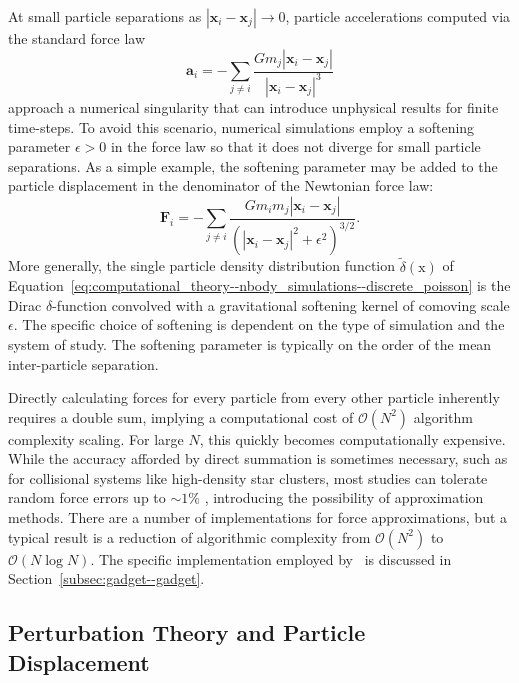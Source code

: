At small particle separations as $|\mathbf{x}_{i} - \mathbf{x}_{j}| \rightarrow 0$, particle accelerations computed via the standard force law
\begin{equation}
	\mathbf{a}_{i} = -\sum_{j \ne i} \frac{G m_{j} | \mathbf{x}_{i} - \mathbf{x}_{j} |}{| \mathbf{x}_{i} - \mathbf{x}_{j} |^{3}}
\end{equation}
approach a numerical singularity that can introduce unphysical results for finite time-steps.  To avoid this scenario, numerical simulations employ a softening parameter $\epsilon > 0$ in the force law so that it does not diverge for small particle separations.  As a simple example, the softening parameter may be added to the particle displacement in the denominator of the Newtonian force law:
\begin{equation}
	\mathbf{F}_{i} = -\sum_{j \ne i} \frac{G m_{i} m_{j} | \mathbf{x}_{i} - \mathbf{x}_{j} |}{(| \mathbf{x}_{i} - \mathbf{x}_{j} |^{2} + \epsilon^{2})^{3/2}}.
\end{equation}
More generally, the single particle density distribution function $\tilde{\delta}(\mathrm{x})$ of Equation~\ref{eq:computational_theory--nbody_simulations--discrete_poisson} is the Dirac $\delta$-function convolved with a gravitational softening kernel of comoving scale $\epsilon$.  The specific choice of softening is dependent on the type of simulation and the system of study.  The softening parameter is typically on the order of the mean inter-particle separation.

Directly calculating forces for every particle from every other particle inherently requires a double sum, implying a computational cost of $\mathcal{O}(N^{2})$ algorithm complexity scaling.  For large $N$, this quickly becomes computationally expensive.  While the accuracy afforded by direct summation is sometimes necessary, such as for collisional systems like high-density star clusters, most studies can tolerate random force errors up to $\sim 1\%$ \citep{1993ApJ...402L..85H}, introducing the possibility of approximation methods.  There are a number of implementations for force approximations, but a typical result is a reduction of algorithmic complexity from $\mathcal{O}(N^{2})$ to $\mathcal{O}(N \log N)$.  The specific implementation employed by \gadgettwo\ is discussed in Section~\ref{subsec:gadget--gadget}.




\subsection{Perturbation Theory and Particle Displacement}
\label{subsec:computational_theory--perturbation_theory}


